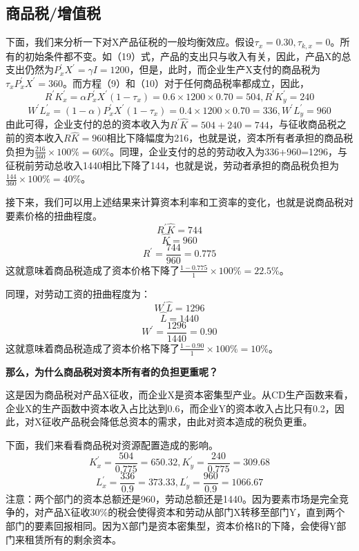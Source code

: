 \documentclass[cn,12pt,math=newtx,citestyle=gb7714-2015,bibstyle=gb7714-2015]{elegantbook}
\begin{document}
	\subsection{商品税/增值税}
	下面，我们来分析一下对X产品征税的一般均衡效应。假设$\tau_x=0.30,\tau_{k,x}=0$。所有的初始条件都不变。如（19）式，产品的支出只与收入有关，因此，产品X的总支出仍然为$P_x^{'}X^{'}=\gamma I=1200$，但是，此时，而企业生产X支付的商品税为$\tau_xP_x^{'}X^{'}=360$。而方程（9）和（10）对于任何商品税率都成立，因此，
	\begin{equation}
		R^{'}K_x^{'}=\alpha P_x^{'}X^{'}(1-\tau_x)=0.6\times 1200 \times 0.70=504,R^{'}K_y^{'}=240
	\end{equation}
	\begin{equation}
		W^{'}L_x^{'}=(1-\alpha) P_x^{'}X^{'}(1-\tau_x)=0.4\times 1200 \times 0.70=336,W^{'}L_y^{'}=960
	\end{equation}
	由此可得，企业支付的总的资本收入为$R^{'}\hat{K}=504+240=744$，与征收商品税之前的资本收入$R\hat{K}=960$相比下降幅度为216，也就是说，资本所有者承担的商品税负担为$\frac{216}{360}\times 100\%=60\%$。同理，企业支付的总的劳动收入为336+960=1296，与征税前劳动总收入1440相比下降了144，也就是说，劳动者承担的商品税负担为$\frac{144}{360}\times 100\%=40\%$。
	
	接下来，我们可以用上述结果来计算资本利率和工资率的变化，也就是说商品税对要素价格的扭曲程度。
	$$R^{'}\hat{K}=744$$
	$$\hat{K}=960$$
	$$R^{'}=\frac{744}{960}=0.775$$
	这就意味着商品税造成了资本价格下降了$\frac{1-0.775}{1}\times 100\%=22.5\%$。
	
	同理，对劳动工资的扭曲程度为：
	$$W^{'}\hat{L}=1296$$
	$$\hat{L}=1440$$
	$$W^{'}=\frac{1296}{1440}=0.90$$
	这就意味着商品税造成了资本价格下降了$\frac{1-0.90}{1}\times 100\%=10\%$。
	
	\textbf{那么，为什么商品税对资本所有者的负担更重呢？}
	
	这是因为商品税对产品X征收，而企业X是资本密集型产业。从CD生产函数来看，企业X的生产函数中资本收入占比达到0.6，而企业Y的资本收入占比只有0.2，因此，对X征收产品税会降低总资本的需求，由此对资本造成的税负更重。
	
	下面，我们来看看商品税对资源配置造成的影响。
	$$K_x^{'}=\frac{504}{0.775}=650.32,K_y^{'}=\frac{240}{0.775}=309.68$$
	$$L_x^{'}=\frac{336}{0.9}=373.33,L_y^{'}=\frac{960}{0.9}=1066.67$$
	注意：两个部门的资本总额还是960，劳动总额还是1440。因为要素市场是完全竞争的，对产品X征收30\%的税会使得资本和劳动从部门X转移至部门Y，直到两个部门的要素回报相同。因为X部门是资本密集型，资本价格R的下降，会使得Y部门来租赁所有的剩余资本。
	
\end{document}
